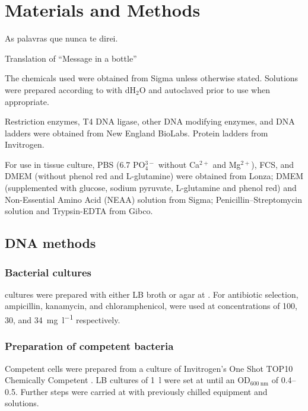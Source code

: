 \chapter{Materials and Methods}
\label{ch:methods}

\epigraph{As palavras que nunca te direi.}{Translation of ``Message in a bottle''}

\noindent
The chemicals used were obtained from Sigma unless otherwise stated. Solutions were prepared
according to  with dH$_2$O and autoclaved prior to use when appropriate.

Restriction enzymes, T4 DNA ligase, other DNA modifying enzymes, and DNA ladders were obtained
from New England BioLabs. Protein ladders from Invitrogen.

For use in tissue culture, PBS (\SI{6.7}{\mM} PO$_4^{3-}$ without Ca$^{2+}$ and Mg$^{2+}$), FCS,
and DMEM (without phenol red and L-glutamine) were obtained from Lonza; DMEM (supplemented with
glucose, sodium pyruvate, L-glutamine and phenol red) and Non-Essential Amino Acid (NEAA) solution
from Sigma; Penicillin--Streptomycin solution and Trypsin-EDTA from Gibco.

\section{DNA methods}
  \subsection{Bacterial cultures}
     cultures were prepared with either LB broth or agar at . For antibiotic
    selection, ampicillin, kanamycin, and chloramphenicol, were used at concentrations of 100, 30,
    and \SI{34}{\mg\per\l} respectively.

  \subsection{Preparation of competent bacteria}
    Competent  cells were prepared from a culture of Invitrogen's One Shot
    TOP10 Chemically Competent . LB cultures of \SI{1}{\l} were set at
     until an OD$_{\SI{600}{\nm}}$ of \numrange{0.4}{0.5}. Further steps were carried
    at  with previously chilled equipment and solutions.
    
